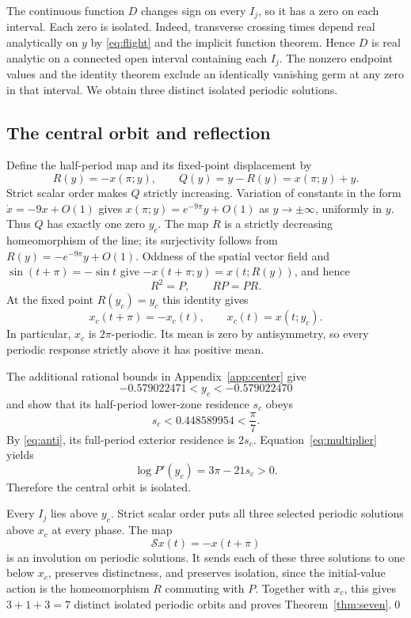 \documentclass[11pt,a4paper]{article}
\begin{document}
The continuous function $D$ changes sign on every $I_j$, so it has a zero
on each interval. Each zero is isolated. Indeed, transverse crossing
times depend real analytically on $y$ by \eqref{eq:flight} and the
implicit function theorem. Hence $D$ is real analytic on a connected
open interval containing each $I_j$. The nonzero endpoint values and
the identity theorem exclude an identically vanishing germ at any zero
in that interval. We obtain three distinct isolated periodic solutions.

\subsection{The central orbit and reflection}
Define the half-period map and its fixed-point displacement by
\[
 R(y)=-x(\pi;y),\qquad Q(y)=y-R(y)=x(\pi;y)+y.
\]
Strict scalar order makes $Q$ strictly increasing. Variation of constants
in the form $\dot x=-9x+O(1)$ gives
$x(\pi;y)=e^{-9\pi}y+O(1)$ as $y\to\pm\infty$, uniformly in $y$.
Thus $Q$ has exactly one zero $y_c$.
The map $R$ is a strictly decreasing homeomorphism of the line; its
surjectivity follows from $R(y)=-e^{-9\pi}y+O(1)$.
Oddness of the spatial vector field and $\sin(t+\pi)=-\sin t$ give
$-x(t+\pi;y)=x(t;R(y))$, and hence
\begin{equation}\label{eq:half-map}
 R^2=P,\qquad RP=PR.
\end{equation}
At the fixed point $R(y_c)=y_c$ this identity gives
\begin{equation}\label{eq:anti}
 x_c(t+\pi)=-x_c(t),\qquad x_c(t)=x(t;y_c).
\end{equation}
In particular, $x_c$ is $2\pi$-periodic.
Its mean is zero by antisymmetry, so every periodic response strictly
above it has positive mean.

The additional rational bounds in Appendix~\ref{app:center} give
\begin{equation}\label{eq:center}
 -0.579022471<y_c<-0.579022470
\end{equation}
and show that its half-period lower-zone residence $s_c$ obeys
\begin{equation}\label{eq:sc}
 s_c<0.448589954<\frac\pi7.
\end{equation}
By \eqref{eq:anti}, its full-period exterior residence is $2s_c$.
Equation~\eqref{eq:multiplier} yields
\[
 \log P'(y_c)=3\pi-21s_c>0.
\]
Therefore the central orbit is isolated.

Every $I_j$ lies above $y_c$. Strict scalar order puts all three selected
periodic solutions above $x_c$ at every phase. The map
\[
 \mathcal Sx(t)=-x(t+\pi)
\]
is an involution on periodic solutions. It sends each of these three
solutions to one below $x_c$, preserves distinctness, and preserves
isolation, since the initial-value action is the homeomorphism $R$
commuting with $P$. Together with $x_c$, this gives $3+1+3=7$ distinct isolated
periodic orbits and proves Theorem~\ref{thm:seven}.\qed
\end{document}
